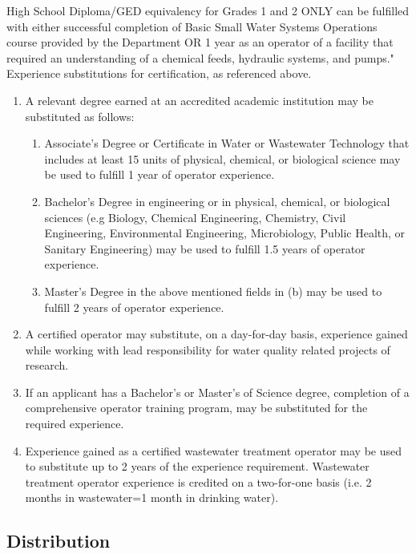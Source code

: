\begin{tiny}
High School Diploma/GED equivalency for Grades 1 and 2 ONLY can be fulfilled with either successful completion of Basic Small Water Systems Operations course provided by the Department
OR 1 year as an operator of a facility that required an understanding of a chemical feeds, hydraulic systems, and pumps."\\			
Experience substitutions for certification, as referenced above.
\begin{enumerate}
\item A relevant degree earned at an accredited academic institution may be substituted as follows:
\begin{enumerate}[label=\alph*)]
\item Associate’s Degree or Certificate in Water or Wastewater Technology that includes at least 15 units of physical, chemical, or biological science may be used to fulfill 1 year of operator experience.
\item Bachelor’s Degree in engineering or in physical, chemical, or biological sciences (e.g Biology, Chemical Engineering, Chemistry, Civil Engineering, Environmental Engineering, Microbiology, Public Health, or Sanitary Engineering) may be used to fulfill 1.5 years of operator experience.
\item Master’s Degree in the above mentioned fields in (b) may be used to fulfill 2 years of operator experience.
\end{enumerate}
\item A certified operator may substitute, on a day-for-day basis, experience gained while working with lead responsibility for water quality related projects of research.
\item If an applicant has a Bachelor’s or Master’s of Science degree, completion of a comprehensive operator training program, may be substituted for the required experience.
\item Experience gained as a certified wastewater treatment operator may be used to substitute up to 2 years of the experience requirement. Wastewater treatment operator experience is credited on a two-for-one basis (i.e. 2 months in wastewater=1 month in drinking water).		
\end{enumerate}
\end{tiny}
\newpage
\subsection{Distribution}

